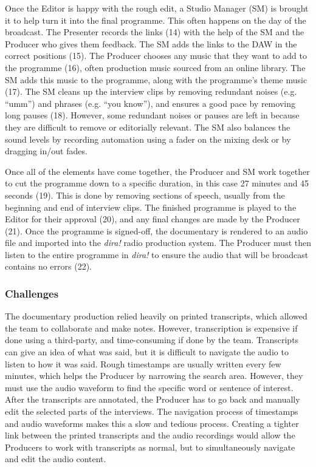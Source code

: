 Once the Editor is happy with the rough edit, a Studio Manager (SM) is brought it to help turn it into the final
programme.  This often happens on the day of the broadcast.  The Presenter records the links (14) with the help of the
SM and the Producer who gives them feedback.  The SM adds the links to the DAW in the correct positions (15). The
Producer chooses any music that they want to add to the programme (16), often production music sourced from an online
library. The SM adds this music to the programme, along with the programme's theme music (17).  The SM cleans up the
interview clips by removing redundant noises (e.g. ``umm'') and phrases (e.g. ``you know''), and ensures a good pace by
removing long pauses (18). However, some redundant noises or pauses are left in because they are difficult to remove or
editorially relevant.  The SM also balances the sound levels by recording automation using a fader on the mixing desk
or by dragging in/out fades. 

Once all of the elements have come together, the Producer and SM work together to cut the programme down to a specific
duration, in this case 27 minutes and 45 seconds (19). This is done by removing sections of speech, usually from the
beginning and end of interview clips.  The finished programme is played to the Editor for their approval (20), and any
final changes are made by the Producer (21).  Once the programme is signed-off, the documentary is rendered to an audio
file and imported into the \textit{dira!} radio production system. The Producer must then listen to the entire
programme in \textit{dira!} to ensure the audio that will be broadcast contains no errors (22).

\subsubsection{Challenges}
The documentary production relied heavily on printed transcripts, which allowed the team to collaborate and make notes.
However, transcription is expensive if done using a third-party, and time-consuming if done by the team.  Transcripts
can give an idea of what was said, but it is difficult to navigate the audio to listen to how it was said. Rough
timestamps are usually written every few minutes, which helps the Producer by narrowing the search area. However, they
must use the audio waveform to find the specific word or sentence of interest. After the transcripts are annotated,
the Producer has to go back and manually edit the selected parts of the interviews. The navigation process of
timestamps and audio waveforms makes this a slow and tedious process.  Creating a tighter link between the printed
transcripts and the audio recordings would allow the Producers to work with transcripts as normal, but to
simultaneously navigate and edit the audio content.

